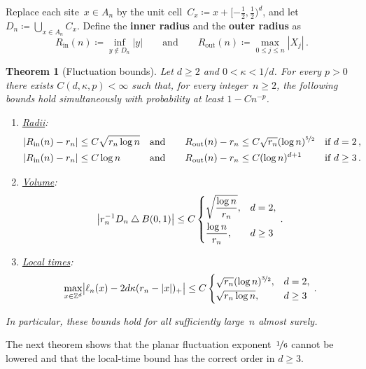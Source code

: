 \documentclass[11pt]{amsart}
\theoremstyle{plain}
\newtheorem{theorem}{Theorem}[section]
\theoremstyle{definition}
\newcommand{\Z}{\mathbb Z}
\newcommand{\drift}{\kappa}
\newcommand{\defn}[1]{\textbf{#1}}
\newcommand{\nf}{\nicefrac}
\newcommand{\Rin}{R_{\mathrm{in}}}
\newcommand{\Rout}{R_{\mathrm{out}}}
\numberwithin{equation}{section}
\begin{document}
Replace each site~$x\in A_n$ by the unit cell~$C_x\coloneqq x+[- \frac12, \frac12)^d$, and let $D_n\coloneqq\bigcup_{x\in A_n}C_x$. Define the \defn{inner radius} and the \defn{outer radius} as
\begin{equation}\label{eq:radii}
\Rin(n)\coloneqq\inf_{y\notin D_n}|y|
\qquad\text{and}\qquad
\Rout(n)\coloneqq\max_{0\leq j\leq n}|X_j|\, .
\end{equation}

\begin{theorem}[Fluctuation bounds]\label{thm:fluctuations}
Let $d\geq2$ and $0<\drift<1/d$. For every $p>0$ there exists $C(d,\drift,p)<\infty$ such that, for every integer~$n\geq2$, the following bounds hold simultaneously with probability at least $1-Cn^{-p}$.
\begin{enumerate}[label=\textup{(\roman*)}]
\item \underline{\emph{Radii}}:
\begin{equation*}
\begin{aligned}
|\Rin(n)-r_n|&\leq C\sqrt{r_n\log n}&&\text{and}\quad&\Rout(n)-r_n&\leq C\sqrt{r_n}(\log n)^{\nf52}&&\text{if } d=2\, ,\\
|\Rin(n)-r_n|&\leq C\log n&&\text{and}\quad&\Rout(n)-r_n&\leq C(\log n)^{d+1}&&\text{if } d\geq3\, .
\end{aligned}
\end{equation*}
\item \underline{\emph{Volume}}:
\begin{equation*}
\bigl|r_n^{-1}D_n\mathbin{\triangle}B(0,1)\bigr|
\leq C\begin{dcases}\sqrt{\frac{\log n}{r_n}},&d=2,\\\frac{\log n}{r_n},&d\geq3\end{dcases}\, .
\end{equation*}
\item \underline{\emph{Local times}}:
\begin{equation*}
\max_{x\in\Z^d}\bigl|\ell_n(x)-2d\drift(r_n-|x|)_+\bigr|
\leq C\begin{cases}\sqrt{r_n}(\log n)^{\nf32},&d=2,\\\sqrt{r_n\log n},&d\geq3\end{cases}\, .
\end{equation*}
\end{enumerate}
In particular, these bounds hold for all sufficiently large~$n$ almost surely. 
\end{theorem}

 The next theorem shows that the planar fluctuation exponent~$\nf16$ cannot be lowered and that the local-time bound has the correct order in $d\geq3$.
\end{document}
